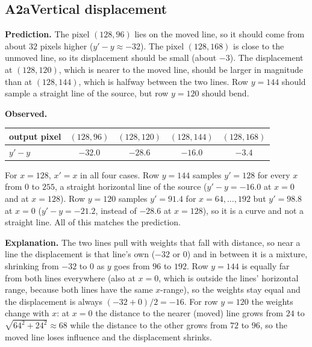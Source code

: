 \documentclass[10pt,a4paper]{article}
\newcommand{\experiment}[5]{%
  \subsection*{#1\quad #2}
  \textbf{Prediction.} #3\par
  \textbf{Observed.} #4\par
  \textbf{Explanation.} #5\par
}
\begin{document}
\experiment{A2a}{Vertical displacement}
  {The pixel $(128,96)$ lies on the moved line, so it should come from about $32$ pixels higher
   ($y'-y\approx-32$). The pixel $(128,168)$ is close to the unmoved line, so its displacement should be small
   (about $-3$). The displacement at $(128,120)$, which is nearer to the moved line, should be larger in
   magnitude than at $(128,144)$, which is halfway between the two lines. Row $y=144$ should sample a straight
   line of the source, but row $y=120$ should bend.}
  {\begin{center}\small
   \begin{tabular}{lcccc}\toprule
     output pixel & $(128,96)$ & $(128,120)$ & $(128,144)$ & $(128,168)$\\\midrule
     $y'-y$ & $-32.0$ & $-28.6$ & $-16.0$ & $-3.4$\\\bottomrule
   \end{tabular}\end{center}
   For $x=128$, $x'=x$ in all four cases. Row $y=144$ samples $y'=128$ for every $x$ from $0$ to $255$,
   a straight horizontal line of the source ($y'-y=-16.0$ at $x=0$ and at $x=128$). Row $y=120$ samples
   $y'=91.4$ for $x=64,\dots,192$ but $y'=98.8$ at $x=0$ ($y'-y=-21.2$, instead of $-28.6$ at $x=128$), so it is
   a curve and not a straight line. All of this matches the prediction.}
  {The two lines pull with weights that fall with distance, so near a line the displacement is that line's
   own ($-32$ or $0$) and in between it is a mixture, shrinking from $-32$ to $0$ as $y$ goes from $96$ to $192$.
   Row $y=144$ is equally far from both lines everywhere (also at $x=0$, which is outside the lines'
   horizontal range, because both lines have the same $x$-range), so the weights stay equal and the displacement
   is always $(-32+0)/2=-16$. For row $y=120$ the weights change with $x$: at $x=0$ the distance to the nearer
   (moved) line grows from $24$ to $\sqrt{64^2+24^2}\approx 68$ while the distance to the other grows from $72$ to
   $96$, so the moved line loses influence and the displacement shrinks.}
\end{document}
